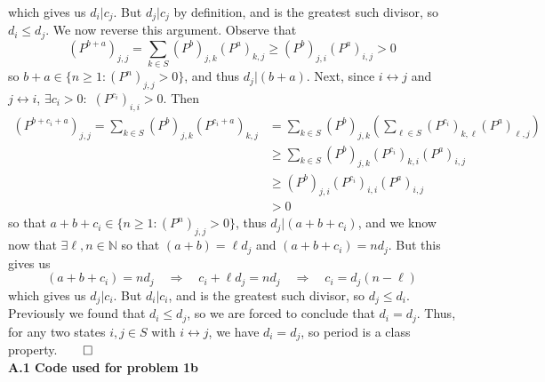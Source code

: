 \documentclass[11pt, letterpaper]{article}
\newcommand{\mbb}[1]{\mathbb{#1}}
\begin{document}
    which gives us $d_i|{c_j}$. But $d_j|{c_j}$ by definition, and is the greatest such divisor, so $d_i\leq d_j$. We now reverse this argument. Observe that
    \[(P^{b+a})_{j,j}=\sum_{k\in S}(P^{b})_{j,k}(P^{a})_{k,j}\geq (P^{b})_{j,i}(P^{a})_{i,j}>0\]
    so $b+a\in\{n\geq 1: (P^n)_{j,j}>0\}$, and thus $d_j|(b+a)$. Next, since $i\longleftrightarrow j$ and $j\longleftrightarrow i$, $\exists c_i>0:$ $(P^{c_i})_{i,i}>0$. Then
    \begin{align*}
        (P^{b+c_i+a})_{j,j}=\sum_{k\in S}(P^b)_{j,k}(P^{c_i+a})_{k,j}&=\sum_{k\in S}(P^b)_{j,k}\left(\sum_{\ell\in S}(P^{c_i})_{k,\ell}(P^{a})_{\ell, j}\right)\\
        &\geq\sum_{k\in S}(P^b)_{j,k}(P^{c_i})_{k,i}(P^a)_{i,j}\\
        &\geq (P^b)_{j,i}(P^{c_i})_{i,i}(P^a)_{i,j}\\
        &>0
    \end{align*} 
    so that $a+b+c_i\in\{n\geq 1:(P^n)_{j,j}>0\}$, thus $d_j|(a+b+c_i)$, and we know now that $\exists \ell,n\in\mbb{N}$ so that $(a+b)=\ell d_j$ and $(a+b+c_i)=nd_j$.  
    But this gives us
    \[(a+b+c_i)=nd_j\quad\Rightarrow\quad c_i+\ell d_j=nd_j\quad\Rightarrow\quad c_i=d_j(n-\ell)\]
    which gives us $d_j|c_i$. But $d_i|c_i$, and is the greatest such divisor, so $d_j\leq d_i$. Previously we found that $d_i\leq d_j$, so we are forced to conclude that $d_i=d_j$.
    Thus, for any two states $i,j\in S$ with $i\longleftrightarrow j$, we have $d_i=d_j$, so period is a class property.\hfill{$\qed$}\newpage
    \\[10pt]
    {\bf A.1 Code used for problem 1b}
\end{document}
